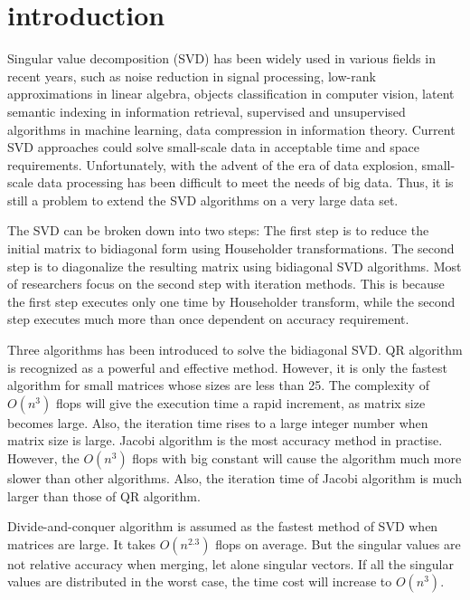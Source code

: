 \section{introduction}
Singular value decomposition (SVD) has been widely used in various fields in recent years,
such as noise reduction in signal processing,
low-rank approximations in linear algebra, 
objects classification in computer vision,
latent semantic indexing in information retrieval,
supervised and unsupervised algorithms in machine learning,
data compression in information theory.
Current SVD approaches could solve small-scale data in acceptable time and space requirements.
Unfortunately, with the advent of the era of data explosion, small-scale data processing has been difficult to meet the needs of big data.
Thus, it is still a problem to extend the SVD algorithms on a very large data set.

The SVD can be broken down into two steps\cite{65SIAM}:
The first step is to reduce the initial matrix to bidiagonal form using Householder transformations.
The second step is to diagonalize the resulting matrix using bidiagonal SVD algorithms.
Most of researchers focus on the second step with iteration methods\cite{58iter1,90iter2,65iter3}.
This is because the first step executes only one time by Householder transform,
while the second step executes much more than once dependent on accuracy requirement.

Three algorithms has been introduced to solve the bidiagonal SVD.
QR algorithm is recognized as a powerful and effective method.
However, it is only the fastest algorithm for small matrices whose sizes are less than 25\cite{97bookalgebra}.
The complexity of $O(n^3)$ flops will give the execution time a rapid increment, as matrix size becomes large.
Also, the iteration time rises to a large integer number when matrix size is large.
Jacobi algorithm is the most accuracy method in practise\cite{97bookalgebra}.
However, the $O(n^3)$ flops with big constant will cause the algorithm much more slower than other algorithms.
Also, the iteration time of Jacobi algorithm is much larger than those of QR algorithm.

Divide-and-conquer algorithm is assumed as the fastest method of SVD when matrices are large\cite{94DCSVD}.
It takes $O(n^{2.3})$ flops on average\cite{97bookalgebra}.
But the singular values are not relative accuracy when merging, let alone singular vectors.
If all the singular values are distributed in the worst case, the time cost will increase to $O(n^3)$.

